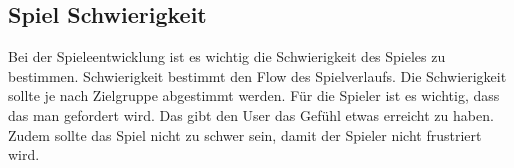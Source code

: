 \subsection{Spiel Schwierigkeit}

Bei der Spieleentwicklung ist es wichtig die Schwierigkeit des Spieles zu bestimmen. Schwierigkeit bestimmt den Flow des Spielverlaufs. Die Schwierigkeit sollte je nach Zielgruppe abgestimmt werden. Für die Spieler ist es wichtig, dass das man gefordert wird. Das gibt den User das Gefühl etwas erreicht zu haben. Zudem sollte das Spiel nicht zu schwer sein, damit der Spieler nicht frustriert wird. 


